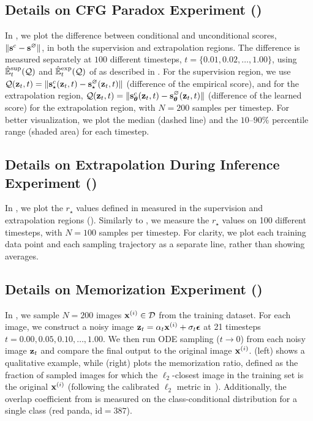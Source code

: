 \subsection{Details on CFG Paradox Experiment ()} \label{app:exp_cfg}

In , we plot the difference between conditional and unconditional scores, $\|{\mathbf{s}}^c - {\mathbf{s}}^\varnothing\|$, in both the supervision and extrapolation regions. The difference is measured separately at $100$ different timesteps, $t = \{0.01, 0.02, \dots, 1.00\}$, using $\hat{\mathbb{E}}_t^{\text{sup}}({\mathcal{Q}})$ and $\hat{\mathbb{E}}_t^{\text{exp}}({\mathcal{Q}})$ of  as described in . For the supervision region, we use ${\mathcal{Q}} ({\mathbf{z}}_t, t) = \|{\mathbf{s}}_\star^c ({\mathbf{z}}_t, t) - {\mathbf{s}}_\star^\varnothing ({\mathbf{z}}_t, t)\|$ (difference of the empirical score), and for the extrapolation region, ${\mathcal{Q}} ({\mathbf{z}}_t, t) = \|{\mathbf{s}}_{\boldsymbol{\theta}}^c ({\mathbf{z}}_t, t) - {\mathbf{s}}_{\boldsymbol{\theta}}^\varnothing ({\mathbf{z}}_t, t)\|$ (difference of the learned score) for the extrapolation region, with $N = 200$ samples per timestep.  For better visualization, we plot the median (dashed line) and the $10–90\%$ percentile range (shaded area) for each timestep.


\subsection{Details on Extrapolation During Inference Experiment ()}

In , we plot the $r_\star$ values defined in  measured in the supervision and extrapolation regions (). Similarly to , we measure the $r_\star$ values on 100 different timesteps, with $N = 100$ samples per timestep. For clarity, we plot each training data point and each sampling trajectory as a separate line, rather than showing averages.

\subsection{Details on Memorization Experiment ()}

In , we sample $N = 200$ images ${\mathbf{x}}^{(i)} \in \mathcal{D}$ from the training dataset. For each image, we construct a noisy image ${\mathbf{z}}_t = \alpha_t {\mathbf{x}}^{(i)} + \sigma_t {\boldsymbol{\epsilon}}$ at 21 timesteps $t = {0.00, 0.05, 0.10, \dots, 1.00}$. We then run ODE sampling ($t \to 0$) from each noisy image ${\mathbf{z}}_t$ and compare the final output to the original image ${\mathbf{x}}^{(i)}$.  (left) shows a qualitative example, while  (right) plots the memorization ratio, defined as the fraction of sampled images for which the $\ell_2$-closest image in the training set is the original ${\mathbf{x}}^{(i)}$ (following the calibrated $\ell_2$ metric in~\citet{carlini2023extracting}). Additionally, the overlap coefficient from  is measured on the class-conditional distribution for a single class (red panda, $\text{id}=387$).



